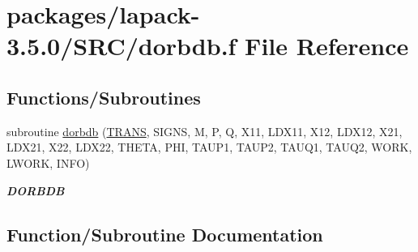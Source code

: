 \hypertarget{dorbdb_8f}{}\section{packages/lapack-\/3.5.0/\+S\+R\+C/dorbdb.f File Reference}
\label{dorbdb_8f}
\subsection*{Functions/\+Subroutines}
\begin{DoxyCompactItemize}
\item 
subroutine \hyperlink{dorbdb_8f_a0b274989e300e298127dc14ac81f9f11}{dorbdb} (\hyperlink{superlu__enum__consts_8h_a0c4e17b2d5cea33f9991ccc6a6678d62a1f61e3015bfe0f0c2c3fda4c5a0cdf58}{T\+R\+A\+N\+S}, S\+I\+G\+N\+S, M, P, Q, X11, L\+D\+X11, X12, L\+D\+X12, X21, L\+D\+X21, X22, L\+D\+X22, T\+H\+E\+T\+A, P\+H\+I, T\+A\+U\+P1, T\+A\+U\+P2, T\+A\+U\+Q1, T\+A\+U\+Q2, W\+O\+R\+K, L\+W\+O\+R\+K, I\+N\+F\+O)
\begin{DoxyCompactList}\small\item\em {\bfseries D\+O\+R\+B\+D\+B} \end{DoxyCompactList}\end{DoxyCompactItemize}


\subsection{Function/\+Subroutine Documentation}
\hypertarget{dorbdb_8f_a0b274989e300e298127dc14ac81f9f11}{}
